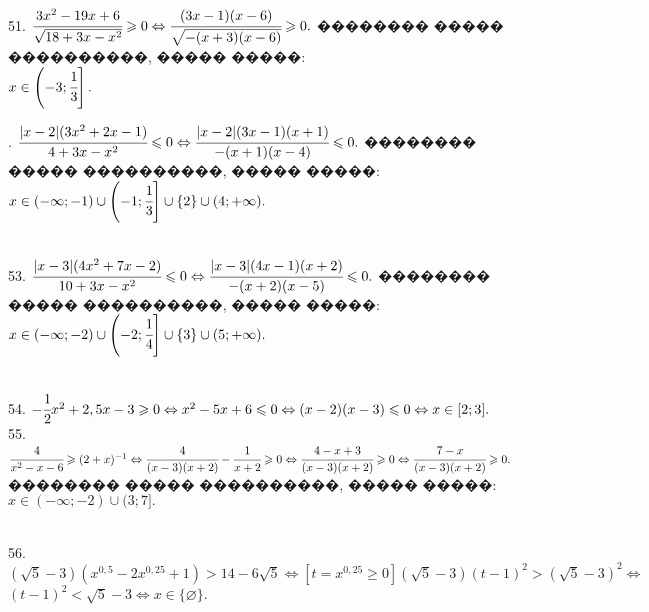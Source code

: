 \documentclass[12pt]{article}
\begin{document}
51. $\cfrac{3x^2-19x+6}{\sqrt{18+3x-x^2}}\geqslant0\Leftrightarrow\cfrac{(3x-1)(x-6)}{\sqrt{-(x+3)(x-6)}}\geqslant0.$ �������� ����� ����������, ����� �����:\\ $x\in\left(-3;\cfrac{1}{3}\right].$
\begin{figure}[ht!]
\end{figure}\newpage{}. $\cfrac{|x-2|(3x^2+2x-1)}{4+3x-x^2}\leqslant0\Leftrightarrow\cfrac{|x-2|(3x-1)(x+1)}{-(x+1)(x-4)}\leqslant0.$ �������� ����� ����������, ����� �����: $x\in(-\infty;-1)\cup\left(-1;\cfrac{1}{3}\right]\cup\{2\}\cup(4;+\infty).$
\begin{figure}[ht!]
\end{figure}\\
53. $\cfrac{|x-3|(4x^2+7x-2)}{10+3x-x^2}\leqslant0\Leftrightarrow\cfrac{|x-3|(4x-1)(x+2)}{-(x+2)(x-5)}\leqslant0.$ �������� ����� ����������, ����� �����: $x\in(-\infty;-2)\cup\left(-2;\cfrac{1}{4}\right]\cup\{3\}\cup(5;+\infty).$
\begin{figure}[ht!]
\end{figure}\\
54. $-\cfrac{1}{2}x^2+2,5x-3\geqslant0\Leftrightarrow x^2-5x+6\leqslant0\Leftrightarrow (x-2)(x-3)\leqslant0\Leftrightarrow x\in[2;3].$\\
55. $\cfrac{4}{x^2-x-6}\geqslant(2+x)^{-1}\Leftrightarrow\cfrac{4}{(x-3)(x+2)}-\cfrac{1}{x+2}\geqslant0\Leftrightarrow\cfrac{4-x+3}{(x-3)(x+2)}\geqslant0
\Leftrightarrow\cfrac{7-x}{(x-3)(x+2)}\geqslant0.$ �������� ����� ����������, ����� �����: $x\in(-\infty;-2)\cup(3;7].$
\begin{figure}[ht!]
\end{figure}\\
56. $(\sqrt{5}-3)(x^{0,5}-2x^{0,25}+1)>14-6\sqrt{5}\Leftrightarrow[t=x^{0,25}\geqslant0](\sqrt{5}-3)(t-1)^2>(\sqrt{5}-3)^2\Leftrightarrow$\\$ (t-1)^2<\sqrt{5}-3
\Leftrightarrow x\in\{\varnothing\}.$\\
\end{document}
